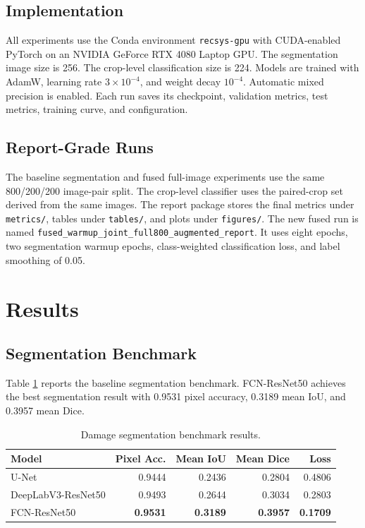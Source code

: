 \documentclass[10pt,conference]{IEEEtran}
\begin{document}
\subsection{Implementation}
All experiments use the Conda environment \texttt{recsys-gpu} with CUDA-enabled PyTorch on an NVIDIA GeForce RTX 4080 Laptop GPU. The segmentation image size is 256. The crop-level classification size is 224. Models are trained with AdamW, learning rate $3\times10^{-4}$, and weight decay $10^{-4}$. Automatic mixed precision is enabled. Each run saves its checkpoint, validation metrics, test metrics, training curve, and configuration.

\subsection{Report-Grade Runs}
The baseline segmentation and fused full-image experiments use the same 800/200/200 image-pair split. The crop-level classifier uses the paired-crop set derived from the same images. The report package stores the final metrics under \texttt{metrics/}, tables under \texttt{tables/}, and plots under \texttt{figures/}. The new fused run is named \texttt{fused\_warmup\_joint\_full800\_augmented\_report}. It uses eight epochs, two segmentation warmup epochs, class-weighted classification loss, and label smoothing of 0.05.

\section{Results}
\subsection{Segmentation Benchmark}
Table \ref{tab:seg_results} reports the baseline segmentation benchmark. FCN-ResNet50 achieves the best segmentation result with 0.9531 pixel accuracy, 0.3189 mean IoU, and 0.3957 mean Dice.

\begin{table}[t]
    \centering
    \caption{Damage segmentation benchmark results.}
    \label{tab:seg_results}
    \begin{tabular}{lrrrr}
        \toprule
        Model & Pixel Acc. & Mean IoU & Mean Dice & Loss \\
        \midrule
        U-Net & 0.9444 & 0.2436 & 0.2804 & 0.4806 \\
        DeepLabV3-ResNet50 & 0.9493 & 0.2644 & 0.3034 & 0.2803 \\
        FCN-ResNet50 & \textbf{0.9531} & \textbf{0.3189} & \textbf{0.3957} & \textbf{0.1709} \\
        \bottomrule
    \end{tabular}
\end{table}
\end{document}

